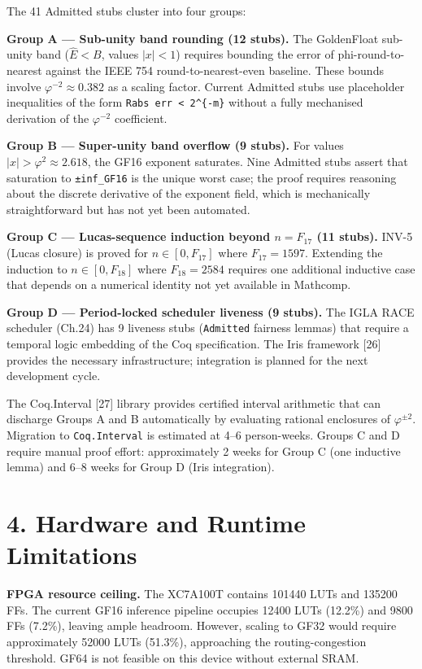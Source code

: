 The 41 Admitted stubs cluster into four groups:

\textbf{Group A --- Sub-unity band rounding (12
stubs).} The GoldenFloat sub-unity band
(\(\hat E < B\), values \(|x| < 1\)) requires
bounding the error of phi-round-to-nearest against
the IEEE 754 round-to-nearest-even baseline. These
bounds involve \(\varphi^{-2} \approx 0.382\) as a
scaling factor. Current Admitted stubs use
placeholder inequalities of the form
\texttt{Rabs\ err\ \textless{}\ 2\^{}\{-m\}}
without a fully mechanised derivation of the
\(\varphi^{-2}\) coefficient.

\textbf{Group B --- Super-unity band overflow (9
stubs).} For values
\(|x| > \varphi^2 \approx 2.618\), the GF16
exponent saturates. Nine Admitted stubs assert
that saturation to \texttt{±inf\_GF16} is the
unique worst case; the proof requires reasoning
about the discrete derivative of the exponent
field, which is mechanically straightforward but
has not yet been automated.

\textbf{Group C --- Lucas-sequence induction
beyond \(n=F_{17}\) (11 stubs).} INV-5 (Lucas
closure) is proved for \(n \in [0, F_{17}]\) where
\(F_{17}=1597\). Extending the induction to
\(n \in [0, F_{18}]\) where \(F_{18}=2584\)
requires one additional inductive case that
depends on a numerical identity not yet available
in Mathcomp.

\textbf{Group D --- Period-locked scheduler
liveness (9 stubs).} The IGLA RACE scheduler
(Ch.24) has 9 liveness stubs (\texttt{Admitted}
fairness lemmas) that require a temporal logic
embedding of the Coq specification. The Iris
framework [26] provides the necessary
infrastructure; integration is planned for the
next development cycle.

The Coq.Interval [27] library provides
certified interval arithmetic that can discharge
Groups A and B automatically by evaluating
rational enclosures of \(\varphi^{\pm 2}\).
Migration to \texttt{Coq.Interval} is estimated at
4--6 person-weeks. Groups C and D require manual
proof effort: approximately 2 weeks for Group C
(one inductive lemma) and 6--8 weeks for Group D
(Iris integration).

\section{4. Hardware and Runtime
Limitations}\label{fa_18:hardware-and-runtime-limitations}

\textbf{FPGA resource ceiling.} The XC7A100T
contains 101440 LUTs and 135200 FFs. The current
GF16 inference pipeline occupies 12400 LUTs
(12.2\%) and 9800 FFs (7.2\%), leaving ample
headroom. However, scaling to GF32 would require
approximately 52000 LUTs (51.3\%), approaching the
routing-congestion threshold. GF64 is not feasible
on this device without external SRAM.

